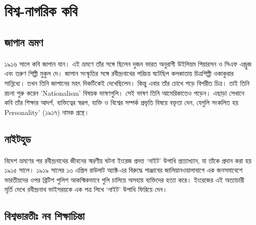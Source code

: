 \documentclass{article}
\begin{document}
\section{বিশ্ব-নাগরিক কবি}
\subsection{জাপান ভ্রমণ}
\paragraph{}
১৯১৬ সালে কবি জাপান যান। এই ভ্রমণে তাঁর সঙ্গে ছিলেন দুজন ভারত অনুরাগী উইলিয়ম পিয়ারসন ও সিএফ এন্ড্রুজ এবং তরুণ শিল্পী মুকুল দে। জাপান সংস্কৃতির সঙ্গে রবীন্দ্রনাথের পরিচয় ঘটেছিল কলকাতায় চিত্রশিল্পী ওকাকুরার সান্নিধ্যে। তখন তিনি জাপানের মহৎ দিকটিকেই দেখেছিলেন। কিন্তু এবার তাঁর চোখে পড়ে বিপরীত চিত্র। তাই তিনি রচনা শুরু করেন 'Nationalism' বিষয়ক ভাষণগুলি। সেই ভাষণ তিনি আমেরিকাতেও পড়েন। এছাড়া সেখানে কবি তাঁর শিক্ষার আদর্শ, ব্যক্তিত্বের স্বরূপ, ব্যক্তি ও বিশ্বের সম্পর্ক প্রভৃতি বিষয়ে বক্তৃতা দেন, যেগুলি সংকলিত হয় Personality' (১৯১৭) নামক  গ্রন্থে।
\subsection{নাইটহুড}
\paragraph{}
বিদেশ ভ্রমণের পর রবীন্দ্রনাথের জীবনের স্মরণীয় ঘটনা ইংরেজ প্রদত্ত ‘নাইট’ উপাধি প্রত্যাখ্যান, যা তাঁকে প্রদান করা হয় ১৯১৫ সালে। ১৯১৯ সালের ১৩ এপ্রিল রাউলাট অ্যাক্ট-এর বিরুদ্ধে পাঞ্জাবের জালিয়ানওয়ালাবাগে এক জনসমাবেশে ভারতীয়দের ওপর ব্রিটিশ পুলিশ আকস্মিকভাবে গুলি চালিয়ে অসহায় ব্যক্তিদের হত্যা করে। ইংরেজের এই অত্যাচারী মূর্তি দেখে রবীন্দ্রনাথ ভাইসরয়কে এক পত্র লিখে ‘নাইট’ উপাধি ফিরিয়ে দেন।
\subsection{বিশ্বভারতীঃ নব শিক্ষাচিন্তা}
\end{document}
